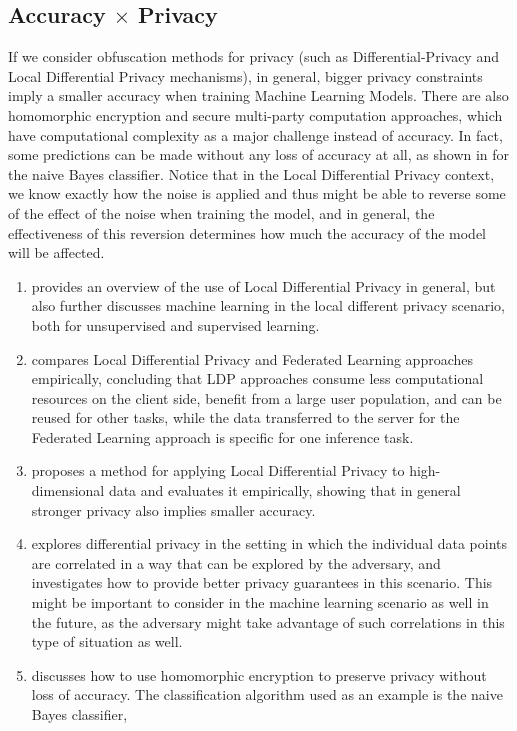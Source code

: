 \subsection{Accuracy $\times$ Privacy}

If we consider obfuscation methods for privacy (such as Differential-Privacy and Local Differential Privacy mechanisms), in general, bigger privacy constraints imply a smaller accuracy when training Machine Learning Models. There are also homomorphic encryption and secure multi-party computation approaches, which have computational complexity as a major challenge instead of accuracy. In fact, some predictions can be made without any loss of accuracy at all, as shown in \cite{yang2005privacy} for the naive Bayes classifier. Notice that in the Local Differential Privacy context, we know exactly how the noise is applied and thus might be able to reverse some of the effect of the noise when training the model, and in general, the effectiveness of this reversion determines how much the accuracy of the model will be affected.

\begin{enumerate}
\item \cite{yang2023local} provides an overview of the use of Local Differential Privacy in general, but also further discusses machine learning in the local different privacy scenario, both for unsupervised and supervised learning.

\item \cite{zheng2020preserving} compares Local Differential Privacy and Federated Learning approaches empirically, concluding that LDP approaches consume less computational resources on the client side, benefit from a large user population, and can be reused for other tasks, while the data transferred to the server for the Federated Learning approach is specific for one inference task.
\item \cite{ren2018textsf} proposes a method for applying Local Differential Privacy to high-dimensional data and evaluates it empirically, showing that in general stronger privacy also implies smaller accuracy.
\item \cite{liu2016dependence} explores differential privacy in the setting in which the individual data points are correlated in a way that can be explored by the adversary, and investigates how to provide better privacy guarantees in this scenario. This might be important to consider in the machine learning scenario as well in the future, as the adversary might take advantage of such correlations in this type of situation as well.
\item \cite{yang2005privacy} discusses how to use homomorphic encryption to preserve privacy without loss of accuracy. The classification algorithm used as an example is the naive Bayes classifier,
\end{enumerate}


